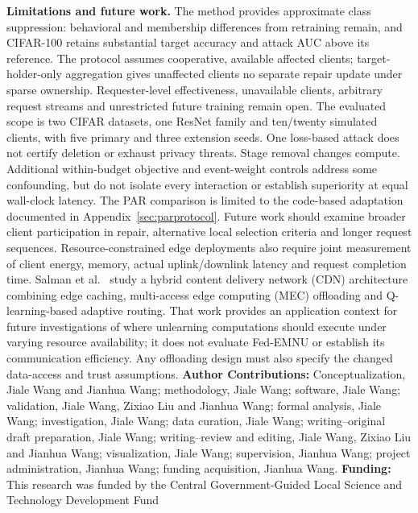 \documentclass[software,article,submit,moreauthors]{Definitions/mdpi}
\begin{document}
\textbf{Limitations and future work.} The method provides approximate class
suppression: behavioral and membership differences from retraining remain,
and CIFAR-100 retains substantial target accuracy and attack AUC above its
reference. The protocol assumes cooperative, available affected clients;
target-holder-only aggregation gives unaffected clients no separate repair
update under sparse ownership. Requester-level effectiveness, unavailable
clients, arbitrary request streams and unrestricted future training remain
open. The evaluated scope is two CIFAR datasets, one ResNet family and
ten/twenty simulated clients, with five primary and three extension seeds.
One loss-based attack does not certify deletion or exhaust privacy threats.
Stage removal changes compute. Additional within-budget objective and
event-weight controls address some confounding, but do not isolate every
interaction or establish superiority at equal wall-clock latency. The PAR comparison is
limited to the code-based adaptation documented in Appendix~\ref{sec:parprotocol}.
Future work should examine broader client participation in repair,
alternative local selection criteria and longer request sequences.
Resource-constrained edge deployments also require joint measurement of client
energy, memory, actual uplink/downlink latency and request completion time.
Salman et al.~\cite{ref26} study a hybrid content delivery network (CDN)
architecture combining edge caching, multi-access edge computing (MEC)
offloading and Q-learning-based adaptive routing. That work provides an
application context for future investigations of where unlearning computations
should execute under varying resource availability; it does not evaluate
Fed-EMNU or establish its communication efficiency. Any offloading design must
also specify the changed data-access and trust assumptions.
\vspace{10pt}
\noindent\textbf{Author Contributions:} Conceptualization, Jiale Wang and
Jianhua Wang; methodology, Jiale Wang; software, Jiale Wang; validation, Jiale
Wang, Zixiao Liu and Jianhua Wang; formal analysis, Jiale Wang; investigation,
Jiale Wang; data curation, Jiale Wang; writing--original draft preparation,
Jiale Wang; writing--review and editing, Jiale Wang, Zixiao Liu and Jianhua
Wang; visualization, Jiale Wang; supervision, Jianhua Wang; project
administration, Jianhua Wang; funding acquisition, Jianhua Wang.
\vspace{6pt}
\noindent\textbf{Funding:} This research was funded by the Central
Government-Guided Local Science and Technology Development Fund
\end{document}
